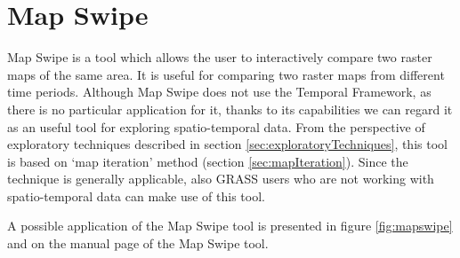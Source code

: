 \documentclass[a4paper,12pt,oneside]{book}
\newcommand{\tf}{Temporal Framework\xspace}
\newcommand{\ms}{Map Swipe\xspace}
\begin{document}

\section{\ms}
\ms is a tool which allows the user to interactively compare two raster maps of the same area.
It is useful for comparing two raster maps from different time periods.
Although \ms does not use the \tf, as there is no particular application for it,
thanks to its capabilities we can regard it as an useful tool for exploring spatio-temporal data.
From the perspective of exploratory techniques described in section \ref{sec:exploratoryTechniques},
this tool is based on `map iteration' method (section \ref{sec:mapIteration}).
Since the technique is generally applicable, also GRASS users who are not working with
spatio-temporal data can make use of this tool.

A possible application of the \ms tool is presented in figure \ref{fig:mapswipe}
and on the manual page \cite{grassUserMan} of the \ms tool.
\end{document}
